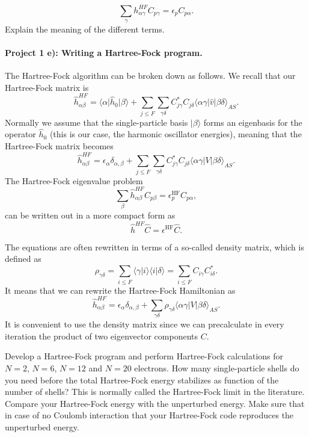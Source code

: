 \documentclass[%
oneside,                 %
final,                   %
10pt]{article}
\begin{document}
\begin{equation*}
\sum_{\gamma}h_{\alpha\gamma}^{HF}C_{p\gamma}=\epsilon_p C_{p\alpha}.
\label{eq:newhf}
\end{equation*}
Explain the meaning of the different terms. 

\paragraph{Project 1 e): Writing a Hartree-Fock program.}
The Hartree-Fock algorithm can be broken down as follows. We recall that  our Hartree-Fock matrix  is 
\[
\hat{h}_{\alpha\beta}^{HF}=\langle \alpha \vert\hat{h}_0 \vert \beta \rangle+
\sum_{j\le F}\sum_{\gamma\delta} C^*_{j\gamma}C_{j\delta}\langle \alpha\gamma|\hat{v}|\beta\delta\rangle_{AS}.
\]
Normally we assume that the single-particle basis $\vert\beta\rangle$
forms an eigenbasis for the operator $\hat{h}_0$ (this is our case, the harmonic oscillator energies), meaning that the
Hartree-Fock matrix becomes
\[
\hat{h}_{\alpha\beta}^{HF}=\epsilon_{\alpha}\delta_{\alpha,\beta}+
\sum_{j\le F}\sum_{\gamma\delta} C^*_{j\gamma}C_{j\delta}\langle \alpha\gamma|V|\beta\delta\rangle_{AS}.
\]
The Hartree-Fock eigenvalue problem
\[
\sum_{\beta}\hat{h}_{\alpha\beta}^{HF}C_{p\beta}=\epsilon_p^{\mathrm{HF}}C_{p\alpha},
\]
can be written out in a more compact form as
\[
\hat{h}^{HF}\hat{C}=\epsilon^{\mathrm{HF}}\hat{C}. 
\]


The equations are often rewritten in terms of a so-called density matrix,
which is defined as 
\begin{equation}
\rho_{\gamma\delta}=\sum_{i\le F}\langle\gamma|i\rangle\langle i|\delta\rangle = \sum_{i\le F}C_{i\gamma}C^*_{i\delta}.
\end{equation}
It means that we can rewrite the Hartree-Fock Hamiltonian as
\[
\hat{h}_{\alpha\beta}^{HF}=\epsilon_{\alpha}\delta_{\alpha,\beta}+
\sum_{\gamma\delta} \rho_{\gamma\delta}\langle \alpha\gamma|V|\beta\delta\rangle_{AS}.
\]
It is convenient to use the density matrix since we can precalculate in every iteration the product of two eigenvector components $C$. 

Develop a Hartree-Fock program and perform Hartree-Fock calculations for $N=2$, $N=6$, $N=12$ and $N=20$ electrons. How many single-particle shells do you need before the total Hartree-Fock energy stabilizes as function of the number of shells? This is normally called the Hartree-Fock limit in the literature.  Compare your Hartree-Fock energy with the unperturbed energy. Make sure that in case of no Coulomb interaction that your Hartree-Fock code reproduces the unperturbed energy.
\end{document}
